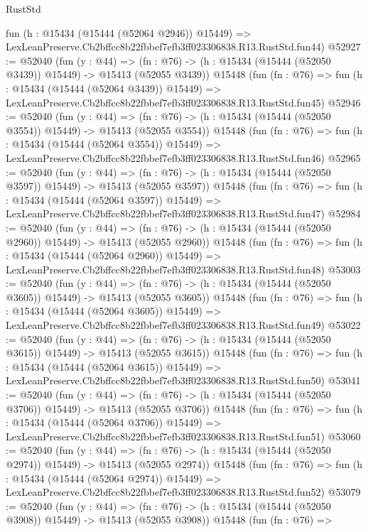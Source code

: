 \begin{lexlean}{RustStd}
\begin{coremodule}
    fun (h : @15434 (@15444 (@52064 @2946)) @15449) =>
    LexLeanPreserve.Cb2bffcc8b22fbbef7efb3ff023306838.R13.RustStd.fun44)
@52927 := @52040
    (fun (y : @44) =>
    (fn : @76) -> (h : @15434 (@15444 (@52050 @3439)) @15449) -> @15413 (@52055 @3439))
    @15448
    (fun (fn : @76) =>
    fun (h : @15434 (@15444 (@52064 @3439)) @15449) =>
    LexLeanPreserve.Cb2bffcc8b22fbbef7efb3ff023306838.R13.RustStd.fun45)
@52946 := @52040
    (fun (y : @44) =>
    (fn : @76) -> (h : @15434 (@15444 (@52050 @3554)) @15449) -> @15413 (@52055 @3554))
    @15448
    (fun (fn : @76) =>
    fun (h : @15434 (@15444 (@52064 @3554)) @15449) =>
    LexLeanPreserve.Cb2bffcc8b22fbbef7efb3ff023306838.R13.RustStd.fun46)
@52965 := @52040
    (fun (y : @44) =>
    (fn : @76) -> (h : @15434 (@15444 (@52050 @3597)) @15449) -> @15413 (@52055 @3597))
    @15448
    (fun (fn : @76) =>
    fun (h : @15434 (@15444 (@52064 @3597)) @15449) =>
    LexLeanPreserve.Cb2bffcc8b22fbbef7efb3ff023306838.R13.RustStd.fun47)
@52984 := @52040
    (fun (y : @44) =>
    (fn : @76) -> (h : @15434 (@15444 (@52050 @2960)) @15449) -> @15413 (@52055 @2960))
    @15448
    (fun (fn : @76) =>
    fun (h : @15434 (@15444 (@52064 @2960)) @15449) =>
    LexLeanPreserve.Cb2bffcc8b22fbbef7efb3ff023306838.R13.RustStd.fun48)
@53003 := @52040
    (fun (y : @44) =>
    (fn : @76) -> (h : @15434 (@15444 (@52050 @3605)) @15449) -> @15413 (@52055 @3605))
    @15448
    (fun (fn : @76) =>
    fun (h : @15434 (@15444 (@52064 @3605)) @15449) =>
    LexLeanPreserve.Cb2bffcc8b22fbbef7efb3ff023306838.R13.RustStd.fun49)
@53022 := @52040
    (fun (y : @44) =>
    (fn : @76) -> (h : @15434 (@15444 (@52050 @3615)) @15449) -> @15413 (@52055 @3615))
    @15448
    (fun (fn : @76) =>
    fun (h : @15434 (@15444 (@52064 @3615)) @15449) =>
    LexLeanPreserve.Cb2bffcc8b22fbbef7efb3ff023306838.R13.RustStd.fun50)
@53041 := @52040
    (fun (y : @44) =>
    (fn : @76) -> (h : @15434 (@15444 (@52050 @3706)) @15449) -> @15413 (@52055 @3706))
    @15448
    (fun (fn : @76) =>
    fun (h : @15434 (@15444 (@52064 @3706)) @15449) =>
    LexLeanPreserve.Cb2bffcc8b22fbbef7efb3ff023306838.R13.RustStd.fun51)
@53060 := @52040
    (fun (y : @44) =>
    (fn : @76) -> (h : @15434 (@15444 (@52050 @2974)) @15449) -> @15413 (@52055 @2974))
    @15448
    (fun (fn : @76) =>
    fun (h : @15434 (@15444 (@52064 @2974)) @15449) =>
    LexLeanPreserve.Cb2bffcc8b22fbbef7efb3ff023306838.R13.RustStd.fun52)
@53079 := @52040
    (fun (y : @44) =>
    (fn : @76) -> (h : @15434 (@15444 (@52050 @3908)) @15449) -> @15413 (@52055 @3908))
    @15448
    (fun (fn : @76) =>

\end{coremodule}
\end{lexlean}
